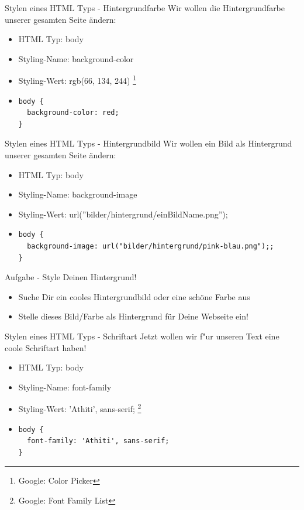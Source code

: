 \documentclass[18pt]{beamer}
\begin{document}
\begin{frame}[fragile]{Stylen eines HTML Typs - Hintergrundfarbe}
Wir wollen die Hintergrundfarbe unserer gesamten Seite ändern:
\begin {itemize}
\item HTML Typ: body
\item Styling-Name: background-color
\item Styling-Wert: rgb(66, 134, 244) \footnote{Google: Color Picker}
\pause
\item 
\begin{lstlisting}
body {
  background-color: red;
}
\end{lstlisting}
\end {itemize}
\end{frame}

\begin{frame}[fragile]{Stylen eines HTML Typs - Hintergrundbild}
Wir wollen ein Bild als Hintergrund unserer gesamten Seite ändern:
\begin {itemize}
\item HTML Typ: body
\item Styling-Name: background-image
\item Styling-Wert: url(''bilder/hintergrund/einBildName.png'');
\pause
\item 
\begin{lstlisting}
body {
  background-image: url("bilder/hintergrund/pink-blau.png");;
}
\end{lstlisting}
\end {itemize}
\end{frame}

\begin{frame}[fragile]{Aufgabe - Style Deinen Hintergrund!}
\begin {itemize}
\item Suche Dir ein cooles Hintergrundbild oder eine schöne Farbe aus
\item Stelle dieses Bild/Farbe als Hintergrund für Deine Webseite ein!
\end {itemize}
\end{frame}

\begin{frame}[fragile]{Stylen eines HTML Typs - Schriftart}
Jetzt wollen wir f"ur unseren Text eine coole Schriftart haben!
\begin {itemize}
\item HTML Typ: body
\item Styling-Name: font-family
\item Styling-Wert: 'Athiti', sans-serif; \footnote{Google: Font Family List}
\pause
\item 
\begin{lstlisting}
body {
  font-family: 'Athiti', sans-serif;
}
\end{lstlisting}
\end {itemize}
\end{frame}
\end{document}
